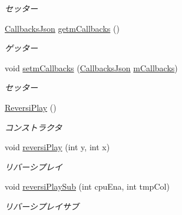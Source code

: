 \begin{DoxyCompactItemize}
\begin{DoxyCompactList}\small\item\em セッター \end{DoxyCompactList}\item 
\hyperlink{classjp_1_1gr_1_1java__conf_1_1yuta__yoshinaga_1_1reversi_1_1model_1_1_callbacks_json}{Callbacks\+Json} \hyperlink{classjp_1_1gr_1_1java__conf_1_1yuta__yoshinaga_1_1reversi_1_1model_1_1_reversi_play_a0aa576ef708b45c21640e9c562c27ece}{getm\+Callbacks} ()
\begin{DoxyCompactList}\small\item\em ゲッター \end{DoxyCompactList}\item 
void \hyperlink{classjp_1_1gr_1_1java__conf_1_1yuta__yoshinaga_1_1reversi_1_1model_1_1_reversi_play_a7d60f70e06930069f315cc1d50c502b6}{setm\+Callbacks} (\hyperlink{classjp_1_1gr_1_1java__conf_1_1yuta__yoshinaga_1_1reversi_1_1model_1_1_callbacks_json}{Callbacks\+Json} \hyperlink{classjp_1_1gr_1_1java__conf_1_1yuta__yoshinaga_1_1reversi_1_1model_1_1_reversi_play_a9b8dce5e6539e8572622befd2391ebb4}{m\+Callbacks})
\begin{DoxyCompactList}\small\item\em セッター \end{DoxyCompactList}\item 
\hyperlink{classjp_1_1gr_1_1java__conf_1_1yuta__yoshinaga_1_1reversi_1_1model_1_1_reversi_play_a8244dde6e8abc75432834de7ccb4f52c}{Reversi\+Play} ()
\begin{DoxyCompactList}\small\item\em コンストラクタ \end{DoxyCompactList}\item 
void \hyperlink{classjp_1_1gr_1_1java__conf_1_1yuta__yoshinaga_1_1reversi_1_1model_1_1_reversi_play_ac2fb56755f7f7d7ab0675035e8581ab1}{reversi\+Play} (int y, int x)
\begin{DoxyCompactList}\small\item\em リバーシプレイ \end{DoxyCompactList}\item 
void \hyperlink{classjp_1_1gr_1_1java__conf_1_1yuta__yoshinaga_1_1reversi_1_1model_1_1_reversi_play_a6ea2a343ad2fb3ef1317570e87c3fc4f}{reversi\+Play\+Sub} (int cpu\+Ena, int tmp\+Col)
\begin{DoxyCompactList}\small\item\em リバーシプレイサブ \end{DoxyCompactList}\item 

\end{DoxyCompactItemize}
